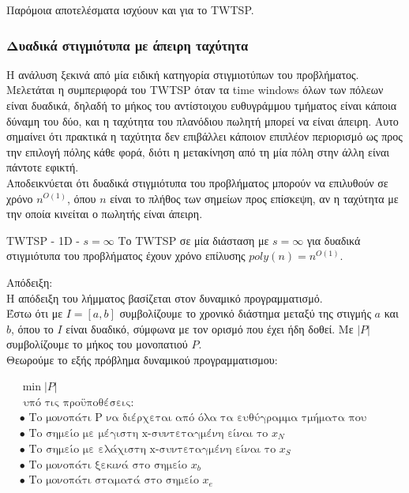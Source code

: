 \documentclass[oneside,12pt]{book}
\theoremstyle{definition}
\begin{document}
Παρόμοια αποτελέσματα ισχύουν και για το TWTSP. \\

\subsubsection{Δυαδικά στιγμιότυπα με άπειρη ταχύτητα}

Η ανάλυση ξεκινά από μία ειδική κατηγορία στιγμιοτύπων του προβλήματος. Μελετάται η συμπεριφορά του TWTSP όταν τα time windows όλων των πόλεων είναι δυαδικά, δηλαδή το μήκος του αντίστοιχου ευθυγράμμου τμήματος είναι κάποια δύναμη του δύο, και η ταχύτητα του πλανόδιου πωλητή μπορεί να είναι άπειρη. Αυτο σημαίνει ότι πρακτικά η ταχύτητα δεν επιβάλλει κάποιον επιπλέον περιορισμό ως προς την επιλογή πόλης κάθε φορά, διότι η μετακίνηση από τη μία πόλη στην άλλη είναι πάντοτε εφικτή. \\

Αποδεικνύεται ότι δυαδικά στιγμιότυπα του προβλήματος μπορούν να επιλυθούν σε χρόνο \(n^{Ο(1)}\), όπου \(n\) είναι το πλήθος των σημείων προς επίσκεψη, αν η ταχύτητα με την οποία κινείται ο πωλητής είναι άπειρη. \\

\begin{mylemma}{TWTSP - 1D - \(s = \infty\)}{}
	Το TWTSP σε μία διάσταση με \(s = \infty\) για δυαδικά στιγμιότυπα του προβλήματος έχουν χρόνο επίλυσης \(poly(n) = n^{O(1)}\).
\end{mylemma}

Απόδειξη: \\
Η απόδειξη του λήμματος βασίζεται στον δυναμικό προγραμματισμό. \\
Έστω ότι με \(I = [a,b]\) συμβολίζουμε το χρονικό διάστημα μεταξύ της στιγμής \(a\) και \(b\), όπου το \(I\) είναι δυαδικό, σύμφωνα με τον ορισμό που έχει ήδη δοθεί. Με \(|P|\) συμβολίζουμε το μήκος του μονοπατιού \(P\). \\
Θεωρούμε το εξής πρόβλημα δυναμικού προγραμματισμου:

\begin{align*}
	&\min |P| \\
	&\text{ υπό τις προϋποθέσεις:} \\
	&\bullet \text{ Το μονοπάτι P να διέρχεται από όλα τα ευθύγραμμα τμήματα που βρίσκονται εντός του I} \\
	&\bullet \text{ Το σημείο με μέγιστη x-συντεταγμένη είναι το } x_N  \\
	&\bullet \text{ Το σημείο με ελάχιστη x-συντεταγμένη είναι το } x_S  \\	
	&\bullet \text{ Το μονοπάτι ξεκινά στο σημείο } x_b \\
	&\bullet \text{ Το μονοπάτι σταματά στο σημείο } x_e
\end{align*}
\end{document}
